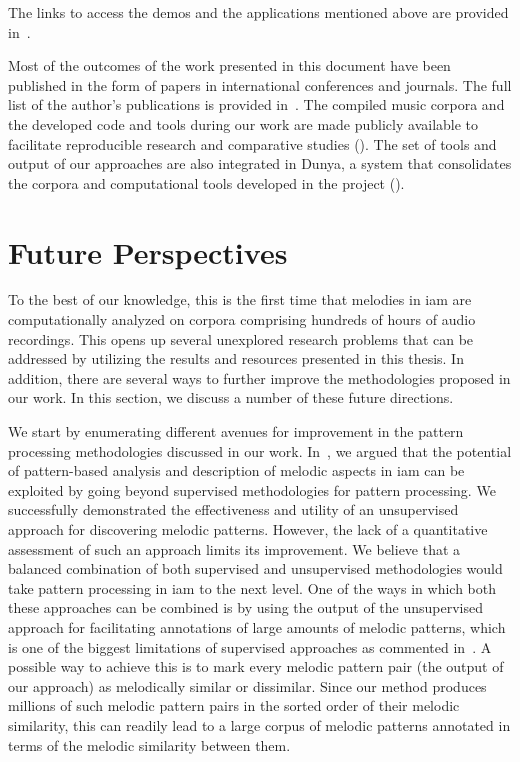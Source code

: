 The links to access the demos and the applications mentioned above are provided in~.

Most of the outcomes of the work presented in this document have been published in the form of papers in international conferences and journals. The full list of the author’s publications is provided in~. The compiled music corpora and the developed code and tools during our work are made publicly available to facilitate reproducible research and comparative studies (). The set of tools and output of our approaches are also integrated in Dunya, a system that consolidates the corpora and computational tools developed in the project ().


\section{Future Perspectives}
\label{sec:future_directions}

To the best of our knowledge, this is the first time that melodies in \gls{iam} are computationally analyzed on corpora comprising hundreds of hours of audio recordings. This opens up several unexplored research problems that can be addressed by utilizing the results and resources presented in this thesis. In addition, there are several ways to further improve the methodologies proposed in our work. In this section, we discuss a number of these future directions. 

We start by enumerating different avenues for improvement in the pattern processing methodologies discussed in our work. In~, we argued that the potential of pattern-based analysis and description of melodic aspects in \gls{iam} can be exploited by going beyond supervised methodologies for pattern processing. We successfully demonstrated the effectiveness and utility of an unsupervised approach for discovering melodic patterns. However, the lack of a quantitative assessment of such an approach limits its improvement. We believe that a balanced combination of both supervised and unsupervised methodologies would take pattern processing in \gls{iam} to the next level. One of the ways in which both these approaches can be combined is by using the output of the unsupervised approach for facilitating annotations of large amounts of melodic patterns, which is one of the biggest limitations of supervised approaches as commented in~. A possible way to achieve this is to mark every melodic pattern pair (the output of our approach) as melodically similar or dissimilar. Since our method produces millions of such melodic pattern pairs in the sorted order of their melodic similarity, this can readily lead to a large corpus of melodic patterns annotated in terms of the melodic similarity between them.

